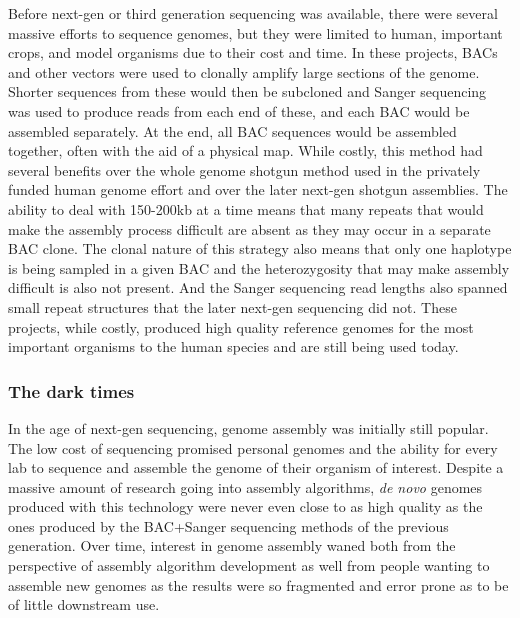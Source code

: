 \par{
Before next-gen or third generation sequencing was available, there were several massive efforts to sequence genomes, but they were limited to human, important crops, and model organisms due to their cost and time\cite{genomeproject}\cite{mousegenome}\cite{maizegenome}. In these projects, BACs and other vectors were used to clonally amplify large sections of the genome. Shorter sequences from these would then be subcloned and Sanger sequencing was used to produce reads from each end of these, and each BAC would be assembled separately. At the end, all BAC sequences would be assembled together, often with the aid of a physical map. While costly, this method had several benefits over the whole genome shotgun method used in the privately funded human genome effort and over the later next-gen shotgun assemblies. The ability to deal with 150-200kb at a time means that many repeats that would make the assembly process difficult are absent as they may occur in a separate BAC clone. The clonal nature of this strategy also means that only one haplotype is being sampled in a given BAC and the heterozygosity that may make assembly difficult is also not present. And the Sanger sequencing read lengths also spanned small repeat structures that the later next-gen sequencing did not. These projects, while costly, produced high quality reference genomes for the most important organisms to the human species and are still being used today.
}

\subsubsection{The dark times}

\par{
In the age of next-gen sequencing, genome assembly was initially still popular. The low cost of sequencing promised personal genomes and the ability for every lab to sequence and assemble the genome of their organism of interest. Despite a massive amount of research going into assembly algorithms, \textit{de novo} genomes produced with this technology were never even close to as high quality as the ones produced by the BAC+Sanger sequencing methods of the previous generation\cite{illuminashit}\cite{gage}. Over time, interest in genome assembly waned both from the perspective of assembly algorithm development as well from people wanting to assemble new genomes as the results were so fragmented and error prone as to be of little downstream use.
}

